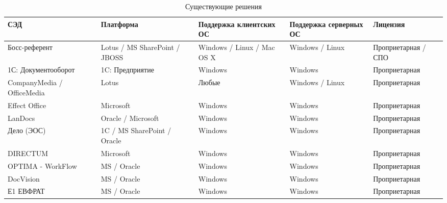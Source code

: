 \begin{table}[h!]
  \captionsetup{justification=raggedright}
  \caption{Существующие решения}\label{table:products}
 \begin{center}
  \begin{tabular}{| >{\centering}m{4cm} | >{\centering}m{3cm} | >{\centering}m{2cm} | >{\centering}m{2cm} | >{\centering}m{3cm} |}
  \hline
  \rowcolor{Gray} СЭД   & Платформа & Поддержка клиентских ОС &  Поддержка серверных ОС & Лицензия  \tabularnewline \hline
  Босс-референт & \color{Green} Lotus / MS SharePoint / JBOSS & \color{Green} Windows / Linux / Mac OS X & \color{Green} Windows / Linux & \color{Green} Проприетарная / СПО   \tabularnewline \hline

  1С: Документооборот & \color{Red} 1C: Предприятие & \color{Red} Windows & \color{Red} Windows & \color{Red} Проприетарная   \tabularnewline \hline

  CompanyMedia / OfficeMedia & \color{Red} Lotus & \color{Green} Любые & \color{Green} Windows / Linux & \color{Red} Проприетарная   \tabularnewline \hline

  Effect Office & \color{Red} Microsoft & \color{Red} Windows & \color{Red} Windows & \color{Red} Проприетарная  \tabularnewline \hline

  LanDocs & \color{Green} Oracle / Microsoft & \color{Red} Windows & \color{Red} Windows & \color{Red} Проприетарная  \tabularnewline \hline

  Дело (ЭОС) & \color{Green} 1C / MS SharePoint / Oracle & \color{Red} Windows & \color{Red} Windows & \color{Red} Проприетарная\  \tabularnewline \hline

  DIRECTUM & \color{Red} Microsoft & \color{Red} Windows & \color{Red} Windows & \color{Red} Проприетарная  \tabularnewline \hline

  OPTIMA - WorkFlow & \color{Green} MS / Oracle & \color{Red} Windows & \color{Red} Windows & \color{Red} Проприетарная   \tabularnewline \hline

  DocVision & \color{Green} MS / Oracle & \color{Red} Windows & \color{Red} Windows & \color{Red} Проприетарная  \tabularnewline \hline

  Е1 ЕВФРАТ & \color{Green} MS / Oracle & \color{Red} Windows & \color{Red} Windows & \color{Red} Проприетарная  \tabularnewline \hline
  \end{tabular}
 \end{center}
\end{table}